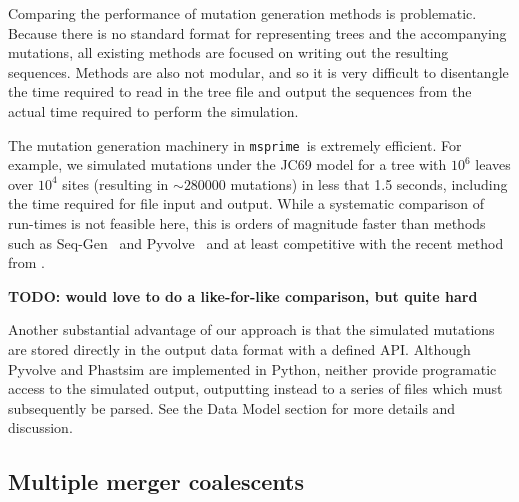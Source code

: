 \documentclass{article}
\newcommand{\msprime}[0]{\texttt{msprime}}
\begin{document}
Comparing the performance of mutation generation methods is problematic.
Because there is no standard format for representing trees and
the accompanying mutations, all existing methods are focused on
writing out the resulting sequences. Methods are also not modular,
and so it is very difficult to disentangle the time required to
read in the tree file and output the sequences from the actual
time required to perform the simulation.

The mutation generation machinery in \msprime\ is extremely
efficient. For example, we simulated mutations under the JC69
model for a tree with $10^6$ leaves over $10^4$ sites (resulting
in $\sim 280000$ mutations) in less that 1.5 seconds, including
the time required for file input and output. While a systematic
comparison of run-times is not feasible here, this is orders
of magnitude faster than methods such as
Seq-Gen~\citep{rambaut1997seq} and
Pyvolve~\citep{spielman2015pyvolve}
and at least competitive with the recent method from
\cite{demaio2021phastsim}.

\textbf{TODO: would love to do a like-for-like comparison, but quite hard}

Another substantial advantage of our approach is that the simulated
mutations are stored directly in the output data format with
a defined API. Although
Pyvolve and Phastsim are implemented in Python, neither provide
programatic access to the simulated output, outputting instead
to a series of files which must subsequently be parsed.
See the Data Model section for more details and discussion.

\subsection*{Multiple merger coalescents}

\label{mmc}%
\end{document}
